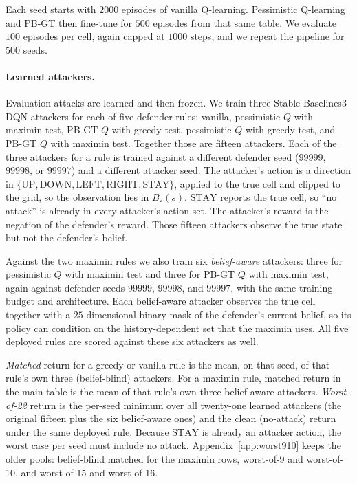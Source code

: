 \documentclass[10pt,twocolumn]{article}
\begin{document}
Each seed starts with $2000$ episodes of vanilla Q-learning.
Pessimistic Q-learning and PB-GT then fine-tune for $500$ episodes from that same table.
We evaluate $100$ episodes per cell, again capped at $1000$ steps, and we repeat the pipeline for $500$ seeds.

\paragraph{Learned attackers.}
Evaluation attacks are learned and then frozen.
We train three Stable-Baselines3 DQN attackers for each of five defender rules: vanilla, pessimistic $Q$ with maximin test, PB-GT $Q$ with greedy test, pessimistic $Q$ with greedy test, and PB-GT $Q$ with maximin test.
Together those are fifteen attackers.
Each of the three attackers for a rule is trained against a different defender seed ($99999$, $99998$, or $99997$) and a different attacker seed.
The attacker's action is a direction in $\{\mathrm{UP},\mathrm{DOWN},\mathrm{LEFT},\mathrm{RIGHT},\mathrm{STAY}\}$, applied to the true cell and clipped to the grid, so the observation lies in $B_\varepsilon(s)$.
$\mathrm{STAY}$ reports the true cell, so ``no attack'' is already in every attacker's action set.
The attacker's reward is the negation of the defender's reward.
Those fifteen attackers observe the true state but not the defender's belief.

Against the two maximin rules we also train six \emph{belief-aware} attackers: three for pessimistic $Q$ with maximin test and three for PB-GT $Q$ with maximin test, again against defender seeds $99999$, $99998$, and $99997$, with the same training budget and architecture.
Each belief-aware attacker observes the true cell together with a $25$-dimensional binary mask of the defender's current belief, so its policy can condition on the history-dependent set that the maximin uses.
All five deployed rules are scored against these six attackers as well.

\emph{Matched} return for a greedy or vanilla rule is the mean, on that seed, of that rule's own three (belief-blind) attackers.
For a maximin rule, matched return in the main table is the mean of that rule's own three belief-aware attackers.
\emph{Worst-of-22} return is the per-seed minimum over all twenty-one learned attackers (the original fifteen plus the six belief-aware ones) and the clean (no-attack) return under the same deployed rule.
Because $\mathrm{STAY}$ is already an attacker action, the worst case per seed must include no attack.
Appendix~\ref{app:worst910} keeps the older pools: belief-blind matched for the maximin rows, worst-of-9 and worst-of-10, and worst-of-15 and worst-of-16.
\end{document}

